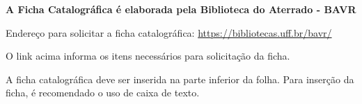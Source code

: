 \vspace*{9cm}

\noindent
\textbf{A Ficha Catalográfica é elaborada pela Biblioteca do Aterrado - BAVR}

\bigskip
\noindent
Endereço para solicitar a ficha catalográfica: \url{https://bibliotecas.uff.br/bavr/}

\bigskip
\noindent
O link acima informa os itens necessários para solicitação da ficha.

\bigskip
\noindent
A ficha catalográfica deve ser inserida na parte inferior da folha. Para inserção da ficha, é recomendado o uso de caixa de texto.

\vspace{2.5cm}

\noindent{}
